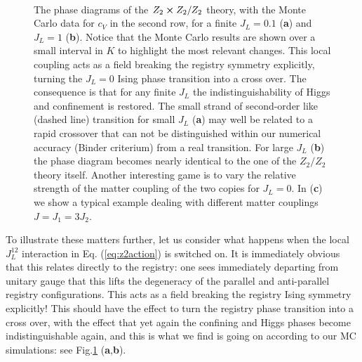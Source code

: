 \begin{figure}[!h]
	\hfill
	\\		
	\caption{The phase diagrams of the $Z_2 \cross Z_2 / Z_2$ theory, with the Monte Carlo data for $c_V$ in the second row, for a finite  $J_L=0.1$ (\textbf{a}) and $J_L = 1$ (\textbf{b}). Notice that  the Monte Carlo results are shown over a small interval in $K$ to highlight the most relevant changes.  This local  coupling acts as a field breaking the registry symmetry explicitly, turning the $J_L =0$ Ising phase transition into a cross over. The consequence is that for any finite $J_L$ the indistinguishability of Higgs and confinement is restored. The small strand of second-order like (dashed line) transition for  small $J_L$ (\textbf{a}) may well be related to a rapid crossover that can not be distinguished within our numerical accuracy (Binder criterium) from a real transition. For large $J_L$ (\textbf{b}) the phase diagram becomes nearly identical to the one of the $Z_2/Z_2$ theory itself. Another interesting game is to vary the relative strength of the matter coupling of the two copies for $J_L =0$.  In (\textbf{c}) we show a typical example  dealing with different matter couplings $J = J_1 = 3 J_2$.}
	\label{Z2xZ2Z2Jl}
\end{figure}

To illustrate these matters further, let us consider what happens when the local $J_L^{12}$ interaction in Eq. (\ref{eq:z2action}) is switched on. It is immediately obvious that this relates directly to the registry: one sees immediately departing from unitary gauge that this lifts the degeneracy of the parallel and anti-parallel registry configurations. This acts as a field breaking the registry Ising symmetry explicitly! This should have the effect to turn the registry phase transition into a cross over, with the effect that yet again the confining and Higgs phases become indistinguishable again, and this is what we find is going on according to our MC simulations: see Fig.\ref{Z2xZ2Z2Jl}  (\textbf{a},\textbf{b}). 

